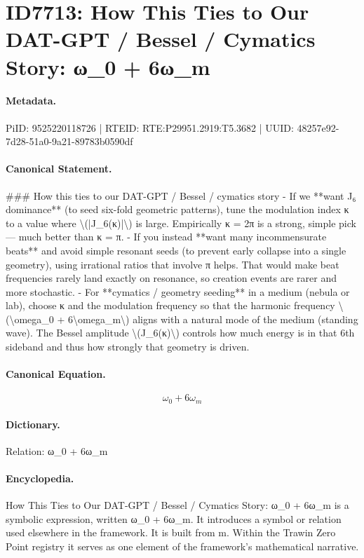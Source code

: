 \section*{ID7713: How This Ties to Our DAT-GPT / Bessel / Cymatics Story: ω\_0 + 6ω\_m}
\paragraph{Metadata.}
PiID: 9525220118726 | RTEID: RTE:P29951.2919:T5.3682 | UUID: 48257e92-7d28-51a0-9a21-89783b0590df

\paragraph{Canonical Statement.}
\#\#\# How this ties to our DAT-GPT / Bessel / cymatics story - If we **want J₆ dominance** (to seed six-fold geometric patterns), tune the modulation index κ to a value where \textbackslash{}(|J\_6(κ)|\textbackslash{}) is large. Empirically κ = 2π is a strong, simple pick — much better than κ = π. - If you instead **want many incommensurate beats** and avoid simple resonant seeds (to prevent early collapse into a single geometry), using irrational ratios that involve π helps. That would make beat frequencies rarely land exactly on resonance, so creation events are rarer and more stochastic. - For **cymatics / geometry seeding** in a medium (nebula or lab), choose κ and the modulation frequency so that the harmonic frequency \textbackslash{}(\textbackslash{}omega\_0 + 6\textbackslash{}omega\_m\textbackslash{}) aligns with a natural mode of the medium (standing wave). The Bessel amplitude \textbackslash{}(J\_6(κ)\textbackslash{}) controls how much energy is in that 6th sideband and thus how strongly that geometry is driven.

\paragraph{Canonical Equation.}
\[
\omega_0 + 6\omega_m
\]

\paragraph{Dictionary.}
Relation: ω\_0 + 6ω\_m

\paragraph{Encyclopedia.}
How This Ties to Our DAT-GPT / Bessel / Cymatics Story: ω\_0 + 6ω\_m is a symbolic expression, written ω\_0 + 6ω\_m. It introduces a symbol or relation used elsewhere in the framework. It is built from m. Within the Trawin Zero Point registry it serves as one element of the framework's mathematical narrative.
